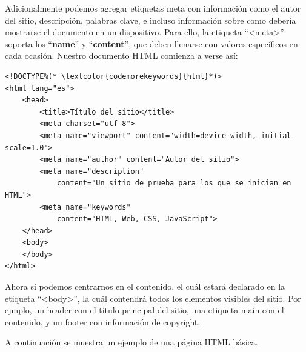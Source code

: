 Adicionalmente podemos agregar etiquetas meta con información como el autor del
sitio, descripción, palabras clave, e incluso información sobre como debería
mostrarse el documento en un dispositivo. Para ello, la etiqueta ``<meta>''
soporta los ``\textbf{name}'' y ``\textbf{content}'', que deben llenarse con
valores específicos en cada ocasión. Nuestro documento HTML comienza a verse así:

\begin{lstlisting}[language=XHTML]
<!DOCTYPE%(* \textcolor{codemorekeywords}{html}*)>
<html lang="es">
    <head>
        <title>Título del sitio</title>
        <meta charset="utf-8">
        <meta name="viewport" content="width=device-width, initial-scale=1.0">
        <meta name="author" content="Autor del sitio">
        <meta name="description"
            content="Un sitio de prueba para los que se inician en HTML">
        <meta name="keywords"
            content="HTML, Web, CSS, JavaScript">
    </head>
    <body>
    </body>
</html>
\end{lstlisting}

Ahora si podemos centrarnos en el contenido, el cuál estará declarado en la
etiqueta ``<body>'', la cuál contendrá todos los elementos visibles del sitio.
Por ejmplo, un header con el titulo principal del sitio, una etiqueta main con
el contenido, y un footer con información de copyright.

A continuación se muestra un ejemplo de una página HTML básica.


